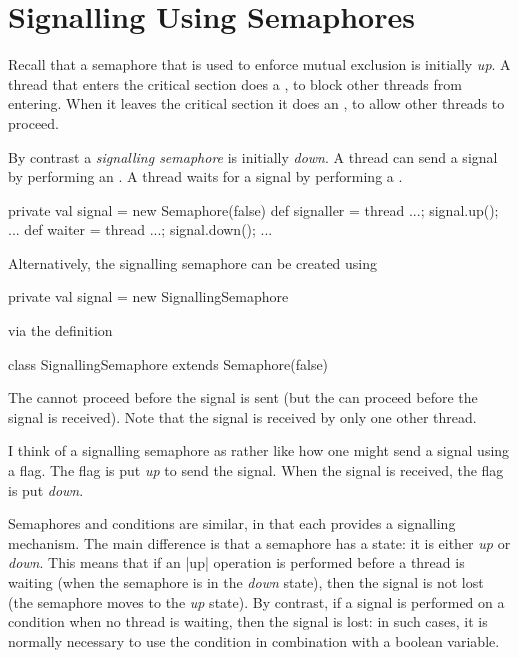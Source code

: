\section{Signalling Using Semaphores}

Recall that a semaphore that is used to enforce mutual exclusion is
initially \emph{up}.  A thread that enters the critical section does a
, to block other threads from entering.  When it leaves the
critical section it does an , to allow other threads to proceed.

By contrast a \emph{signalling semaphore} is
initially \emph{down}.  A thread can send a signal by performing an
.  A thread waits for a signal by performing a .
\begin{scala}
  private val signal = new Semaphore(false)
  def signaller = thread{ ...; signal.up(); ... }
  def waiter = thread{ ...; signal.down(); ... }
\end{scala}  
%
%
Alternatively, the signalling semaphore can be created
using
\begin{scala}
  private val signal = new SignallingSemaphore
\end{scala}
via the definition
\begin{scala}
  class SignallingSemaphore extends Semaphore(false)
\end{scala}
%
The  cannot proceed before the signal is sent (but the
 can proceed before the signal is received).
Note that the signal is received by only one other thread.  

I think of a signalling semaphore as rather like how one might send a signal
using a flag.  The flag is put \emph{up} to send the signal.  When the signal
is received, the flag is put \emph{down}. 


Semaphores and conditions are similar, in that each provides a signalling
mechanism.
%
The main difference is that a semaphore has a state: it is either \emph{up} or
\emph{down}.  This means that if an |up| operation is performed before a
thread is waiting (when the semaphore is in the \emph{down} state), then the
signal is not lost (the semaphore moves to the \emph{up} state).
%
By contrast, if a signal is performed on a condition when no thread is
waiting, then the signal is lost: in such cases, it is normally necessary to
use the condition in combination with a boolean variable.

